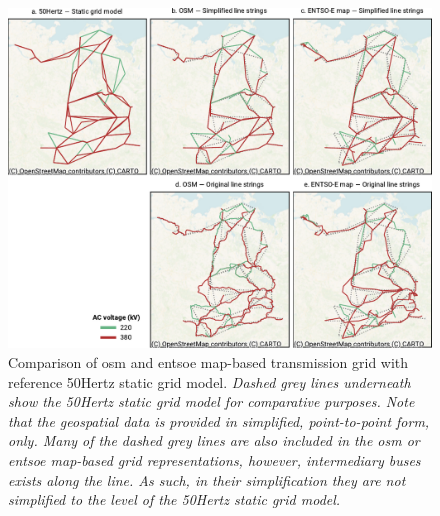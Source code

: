 \documentclass[fleqn,10pt]{wlscirep}
\let\autocite\cite
\begin{document}
\begin{figure}[!htbp]
    \centering
    \includegraphics{figures/fig_osm_vs_50Hertz_sgm.pdf}
    \caption{Comparison of \acrshort{osm} and \acrshort{entsoe} map-based transmission grid with reference 50Hertz static grid model.\autocite{50hertzStaticGridModel2022} \textit{Dashed grey lines underneath show the 50Hertz static grid model for comparative purposes. Note that the geospatial data is provided in simplified, point-to-point form, only. Many of the dashed grey lines are also included in the \acrshort{osm} or \acrshort{entsoe} map-based grid representations, however, intermediary buses exists along the line. As such, in their simplification they are not simplified to the level of the 50Hertz static grid model.}}
    \label{fig:osm_vs_50Hertz_sgm}
\end{figure}
\end{document}
